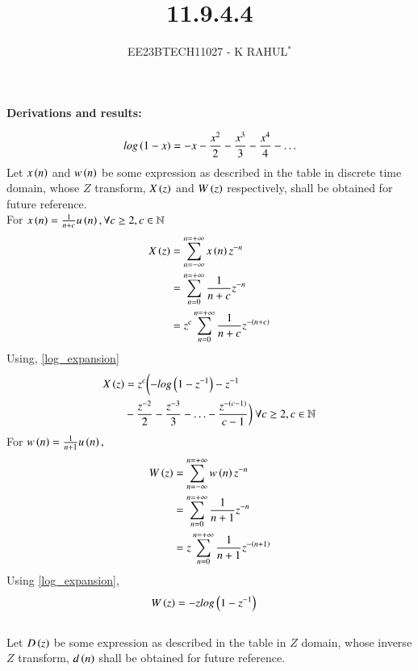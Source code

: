 \documentclass[journal,12pt,twocolumn]{IEEEtran}
\theoremstyle{remark}
\begin{document}

\vspace{3cm}
\title{11.9.4.4}
\author{EE23BTECH11027 - K RAHUL$^{*}$%
}
\maketitle
\newpage
\bigskip
\renewcommand{\thefigure}{\theenumi}
\renewcommand{\thetable}{\theenumi}
\textbf{Derivations and results:} \\
\begin{table}[ht]

\end{table}
\begin{align}
        log\left(1-x\right) = -x - \frac{x^2}{2} - \frac{x^3}{3}-\frac{x^4}{4}- \ldots \label{log_expansion}
\end{align}
Let $x\left(n\right)$ and $w\left(n\right)$ be some expression as described in the table in discrete time domain, whose $Z$ transform, $X\left(z\right)$ and $W\left(z\right)$ respectively, shall be obtained for future reference.\\
For  $x\left(n\right) = \frac{1}{n+c} u\left(n\right),\forall c \geq 2,c \in \mathbb{N}$
\begin{align}
    X\left(z\right) &= \sum_{n= -\infty}^{n= +\infty} x\left(n\right)z^{-n}\\
    &=\sum_{n = 0}^{n = +\infty} \frac{1}{n+c}z^{-n}\\
    &= z^c\sum_{n = 0}^{n = +\infty} \frac{1}{n+c}z^{-\left(n+c\right)}
\end{align}
Using, \eqref{log_expansion}
\begin{align}
    X\left(z\right)&= z^c \biggl(-log\left(1-z^{-1}\right)- z^{-1}\notag\\& -\frac{z^{-2}}{2}-\frac{z^{-3}}{3} - \ldots -\frac{z^{-(c-1)}}{c-1} \biggr)\ \forall c \geq 2, c \in \mathbb{N} \label{11027_eq1}
\end{align} 
For $w\left(n\right) = \frac{1}{n+1}u\left(n\right),$\\
\begin{align}
	W\left(z\right) &=\sum_{n= -\infty}^{n= +\infty} w\left(n\right)z^{-n}\\
	&= \sum_{n = 0}^{n = +\infty} \frac{1}{n+1}z^{-n}\\
	&= z\sum_{n = 0}^{n = +\infty} \frac{1}{n+1}z^{-\left(n+1\right)} 
\end{align}
Using \eqref{log_expansion},
\begin{align}
	W\left(z\right)&= -zlog\left(1-z^{-1}\right) \label{When_c_equals_1}	
\end{align}
\\
Let $D\left(z\right)$ be some expression as described in the table in $Z$ domain, whose inverse $Z$ transform, $d\left(n\right)$ shall be obtained for future reference.\\
\end{document}
